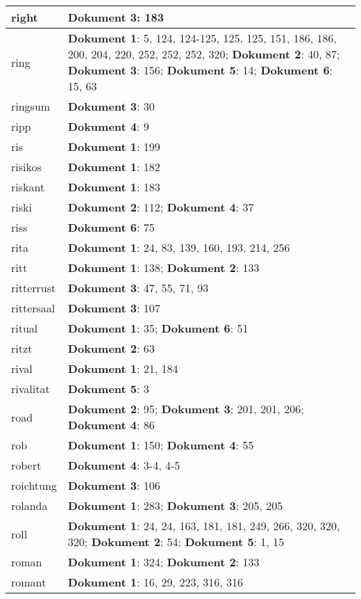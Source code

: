\documentclass[a5paper]{article}
\begin{document}
\begin{longtable}[l]{|l|p{3in}|}
\hline
right & \textbf{Dokument 3}: 183 \\
\hline
ring & \textbf{Dokument 1}: 5, 124, 124-125, 125, 125, 151, 186, 186, 200, 204, 220, 252, 252, 252, 320; \textbf{Dokument 2}: 40, 87; \textbf{Dokument 3}: 156; \textbf{Dokument 5}: 14; \textbf{Dokument 6}: 15, 63 \\
\hline
ringsum & \textbf{Dokument 3}: 30 \\
\hline
ripp & \textbf{Dokument 4}: 9 \\
\hline
ris & \textbf{Dokument 1}: 199 \\
\hline
risikos & \textbf{Dokument 1}: 182 \\
\hline
riskant & \textbf{Dokument 1}: 183 \\
\hline
riski & \textbf{Dokument 2}: 112; \textbf{Dokument 4}: 37 \\
\hline
riss & \textbf{Dokument 6}: 75 \\
\hline
rita & \textbf{Dokument 1}: 24, 83, 139, 160, 193, 214, 256 \\
\hline
ritt & \textbf{Dokument 1}: 138; \textbf{Dokument 2}: 133 \\
\hline
ritterrust & \textbf{Dokument 3}: 47, 55, 71, 93 \\
\hline
rittersaal & \textbf{Dokument 3}: 107 \\
\hline
ritual & \textbf{Dokument 1}: 35; \textbf{Dokument 6}: 51 \\
\hline
ritzt & \textbf{Dokument 2}: 63 \\
\hline
rival & \textbf{Dokument 1}: 21, 184 \\
\hline
rivalitat & \textbf{Dokument 5}: 3 \\
\hline
road & \textbf{Dokument 2}: 95; \textbf{Dokument 3}: 201, 201, 206; \textbf{Dokument 4}: 86 \\
\hline
rob & \textbf{Dokument 1}: 150; \textbf{Dokument 4}: 55 \\
\hline
robert & \textbf{Dokument 4}: 3-4, 4-5 \\
\hline
roichtung & \textbf{Dokument 3}: 106 \\
\hline
rolanda & \textbf{Dokument 1}: 283; \textbf{Dokument 3}: 205, 205 \\
\hline
roll & \textbf{Dokument 1}: 24, 24, 163, 181, 181, 249, 266, 320, 320, 320; \textbf{Dokument 2}: 54; \textbf{Dokument 5}: 1, 15 \\
\hline
roman & \textbf{Dokument 1}: 324; \textbf{Dokument 2}: 133 \\
\hline
romant & \textbf{Dokument 1}: 16, 29, 223, 316, 316 \\

\end{longtable}
\end{document}
